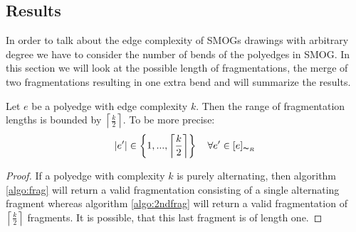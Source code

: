 \subsection{Results}
In order to talk about the edge complexity of SMOGs drawings with arbitrary degree we have to consider the number of bends of the polyedges in SMOG. In this section we will look at the possible length of fragmentations, the merge of two fragmentations resulting in one extra bend and will summarize the results.
\begin{lemma}
	Let $e$ be a polyedge with edge complexity $k$. Then the range of fragmentation lengths is bounded by $\left\lceil\frac{k}{2}\right\rceil$. To be more precise: $$ |e'| \in \left\{1,..., \left\lceil\frac{k}{2}\right\rceil\right\}~~~\forall e'\in [e]_{\thicksim_R} $$
\end{lemma}
\begin{proof}
	If a polyedge with complexity $k$ is purely alternating, then algorithm \ref{algo:frag} will return a valid fragmentation consisting of a single alternating fragment whereas algorithm \ref{algo:2ndfrag} will return a valid fragmentation of $\left\lceil\frac{k}{2}\right\rceil$ fragments. It is possible, that this last fragment is of length one.%
	
\end{proof}
